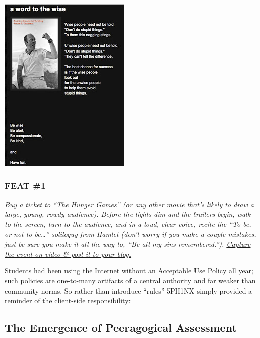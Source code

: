 \begin{center}
\includegraphics{../pictures/word_to.jpg}
\end{center}

\subsubsection{FEAT \#1}

\emph{Buy a ticket to ``The Hunger Games'' (or any other movie that's
likely to draw a large, young, rowdy audience). Before the lights dim
and the trailers begin, walk to the screen, turn to the audience, and in
a loud, clear voice, recite the ``To be, or not to be\ldots{}''
soliloquy from Hamlet (don't worry if you make a couple mistakes, just
be sure you make it all the way to, ``Be all my sins remembered.'').
\href{http://alarhsenglitcomp.blogspot.com/2012/12/feats-of-wisdom-1\_15.html}{Capture
the event on video \& post it to your blog.}} 

Students had been using the Internet without an Acceptable Use Policy
all year; such policies are one-to-many artifacts of a central
authority and far weaker than community norms. So rather than
introduce ``rules'' 5PH1NX simply provided a reminder of the
client-side responsibility:

\subsection{The Emergence of Peeragogical Assessment}

